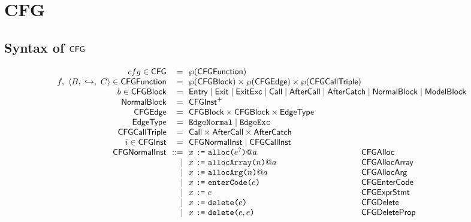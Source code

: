 \chapter{CFG}


\section{Syntax of $\mbox{\textsf{CFG}}$}
\[
\begin{array}{r@{~~}r@{~~}l@{}ll}
cfg \in \CFG & = & \powerset{\CFGFunction} & \\
f,\ \langle B,\ \hookrightarrow,\ C \rangle \in \CFGFunction & = & \powerset{\CFGBlock} \times \powerset{\CFGEdge} \times \powerset{\CFGCallTriple} & \\
b \in \CFGBlock & = & \multicolumn{2}{@{}l}{\Entry \mid \Exit \mid \ExitExc \mid \Call \mid \AfterCall \mid \AfterCatch \mid \NormalBlock \mid \ModelBlock} \\
\NormalBlock & = & \CFGInst^+ & \\
\CFGEdge & = & \CFGBlock \times \CFGBlock \times \EdgeType & \\
\EdgeType & = & \EdgeNormal \mid \EdgeExc & \\
\CFGCallTriple & = & \Call \times \AfterCall \times \AfterCatch & \\

i \in \CFGInst & = & \CFGNormalInst \mid \CFGCallInst &
\\

\CFGNormalInst & ::= &
x~\verb+:=+~\TT{alloc}\verb+(+ e^{?} \verb+)+ @ a
& \SF{CFGAlloc}
\\

& \mid & x~\verb+:=+~\TT{allocArray}\verb+(+n\verb+)+ @ a
 & \SF{CFGAllocArray}
\\

& \mid & x~\verb+:=+~\TT{allocArg}\verb+(+n\verb+)+ @ a
 & \SF{CFGAllocArg}
\\

& \mid & x~\verb+:=+~\TT{enterCode}\verb+(+e\verb+)+
 & \SF{CFGEnterCode}
\\

& \mid & x ~\verb+:=+~ e
 & \SF{CFGExprStmt}
\\

& \mid & x ~\verb+:=+~ \TT{delete}\verb+(+e\verb+)+
 & \SF{CFGDelete}
\\

& \mid & x ~\verb+:=+~ \TT{delete}\verb+(+e,e\verb+)+
 & \SF{CFGDeleteProp}
\\


\end{array}\]
